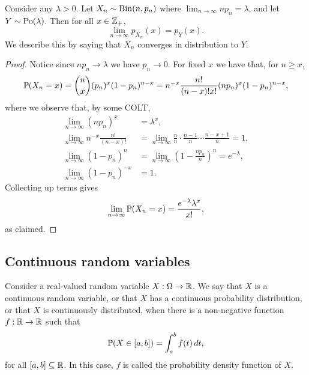 \documentclass[10pt, a4paper]{article}
\begin{document}
\begin{theorem}
    Consider any $\lambda > 0$. Let $X_n \sim \Bin(n, p_n)$ where $\lim_{n \rightarrow \infty} np_n = \lambda$, and let $Y \sim \Po(\lambda)$. Then for all $x \in \Z_+$,
    \[
    \lim_{n \rightarrow \infty}p_{X_n}(x) = p_Y(x).
    \]
    We describe this by saying that $X_n$ converges in distribution to $Y$.
    \begin{proof}
        Notice since $np_n \rightarrow \lambda$ we have $p_n \rightarrow 0$.
        For fixed $x$ we have that, for $n \geq x$,
        \[
        \P(X_n = x) = \binom{n}{x}(p_n) ^ x (1 - p_n) ^ {n - x} = n ^ {-x}\frac{n!}{(n - x)!x!}(np_n) ^ x (1 - p_n) ^ {n - x},
        \]
        where we observe that, by some COLT,
        \begin{align*}
            \lim_{n \rightarrow \infty} (np_n) ^ x &= \lambda ^ x, \\
            \lim_{n \rightarrow \infty} n ^ {-x} \frac{n!}{(n - x)!} &= \lim_{n \rightarrow \infty} \frac{n}{n} \cdot \frac{n - 1}{n} \dotsi \frac{n - x + 1}{n} = 1, \\
            \lim_{n \rightarrow \infty} (1 - p_n) ^ n &= \lim_{n \rightarrow \infty}\left(1 - \frac{np_n}{n}\right) ^ n = e ^ {-\lambda}, \\
            \lim_{n \rightarrow \infty} (1 - p_n) ^ {-x} &= 1.
        \end{align*}
        Collecting up terms gives
        \[
        \lim_{n \rightarrow \infty}\P(X_n = x) = \frac{e ^ {-\lambda}\lambda ^ x}{x!},
        \]
        as claimed.
    \end{proof}
\end{theorem}

\subsection{Continuous random variables}
\begin{definition}\label{pre:prob:def:crvandpdf}
Consider a real-valued random variable $X : \Omega \rightarrow \R$.
We say that $X$ is a continuous random variable,
or that $X$ has a continuous probability distribution,
or that $X$ is continuously distributed,
when there is a non-negative function $f : \R \rightarrow \R$ such that
\[
\P(X \in [a, b]) = \int_{a}^{b}f(t)\,dt,
\]
for all $[a, b] \subseteq \R$.
In this case,
$f$ is called the probability density function of $X$.
\end{definition}
\end{document}
